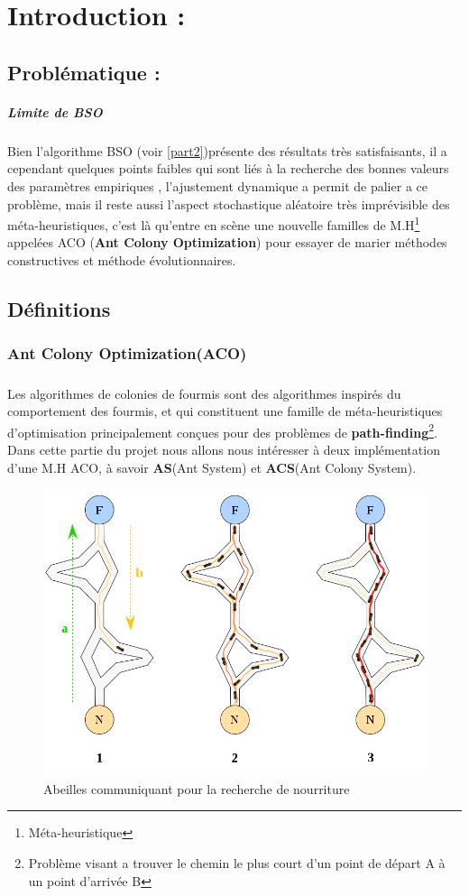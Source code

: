 
\chapter{Introduction : }
\section{Problématique : }
\paragraph{Limite de BSO }
Bien l'algorithme BSO (voir \ref{part2})présente des résultats très satisfaisants, il a cependant quelques points faibles qui sont liés à la recherche des bonnes valeurs des paramètres empiriques , l'ajustement dynamique a permit de palier a ce problème, mais il reste aussi l'aspect stochastique aléatoire très imprévisible des méta-heuristiques, c'est là qu'entre en scène une nouvelle familles de  M.H\footnote{Méta-heuristique} appelées ACO (\textbf{Ant Colony Optimization}) pour essayer de marier méthodes constructives et méthode évolutionnaires.
\section{Définitions}
\subsection{Ant Colony Optimization(ACO)}
\paragraph{}
Les algorithmes de colonies de fourmis sont des algorithmes inspirés du comportement des fourmis, et qui constituent une famille de méta-heuristiques d’optimisation principalement conçues pour des problèmes de \textbf{path-finding}\footnote{Problème visant a trouver le chemin le plus court d'un point de départ A à un point d'arrivée B}.
Dans cette partie du projet nous allons nous intéresser à deux implémentation d'une M.H ACO, à savoir \textbf{AS}(Ant System) et \textbf{ACS}(Ant Colony System).
\begin{figure}[H]
	\centering
	\includegraphics[scale=0.25]{images/ants.png}
	\caption{Abeilles communiquant pour la recherche de nourriture}
\end{figure}

